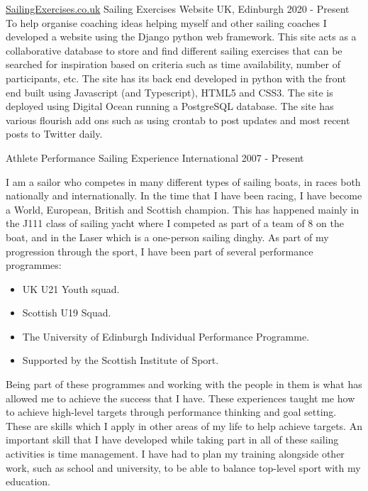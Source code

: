 


\begin{cventries}

    \cventry
        {\href{www.sailingexercises.co.uk}{SailingExercises.co.uk}}
        {Sailing Exercises Website}
        {UK, Edinburgh}
        {2020 - Present}
        {
        To help organise coaching ideas helping myself and other sailing coaches I developed a website using the Django python web framework. This site acts as a collaborative database to store and find different sailing exercises that can be searched for inspiration based on criteria such as time availability, number of participants, etc. The site has its back end developed in python with the front end built using Javascript (and Typescript), HTML5 and CSS3. The site is deployed using Digital Ocean running a PostgreSQL database. The site has various flourish add ons such as using crontab to post updates and most recent posts to Twitter daily.\newline
        }
    
  \cventry
    {Athlete} %
    {Performance Sailing Experience} %
    {International} %
    {2007 - Present} %
    {
      I am a sailor who competes in many different types of sailing boats, in races both nationally and internationally. In the time that I have been racing, I have become a World, European, British and Scottish champion. This has happened mainly in the J111 class of sailing yacht where I competed as part of a team of 8 on the boat, and in the Laser which is a one-person sailing dinghy. As part of my progression through the sport, I have been part of several performance programmes:
      \begin{itemize}
          \item UK U21 Youth squad.
          \item Scottish U19 Squad.
          \item The University of Edinburgh Individual Performance Programme.
          \item Supported by the Scottish Institute of Sport.
      \end{itemize}
      Being part of these programmes and working with the people in them is what has allowed me to achieve the success that I have. These experiences taught me how to achieve high-level targets through performance thinking and goal setting. These are skills which I apply in other areas of my life to help achieve targets. An important skill that I have developed while taking part in all of these sailing activities is time management. I have had to plan my training alongside other work, such as school and university, to be able to balance top-level sport with my education.
    }


\end{cventries}
